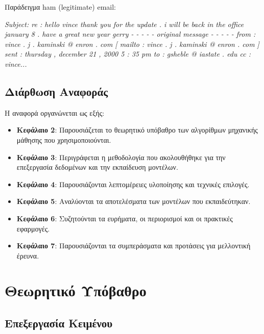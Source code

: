 \documentclass[12pt,a4paper,twoside]{book}
\begin{document}
Παράδειγμα ham (legitimate) email:

\begin{tcolorbox}[colback=customBgGray!30, colframe=customCodeGreen, title=Παράδειγμα Ham Email]
    \small
    \textit{Subject: re : hello vince thank you for the update . i will be back in the office january 8 . have a great new year gerry - - - - - original message - - - - - from : vince . j . kaminski @ enron . com [ mailto : vince . j . kaminski @ enron . com ] sent : thursday , december 21 , 2000 5 : 35 pm to : gsheble @ iastate . edu cc : vince...}
\end{tcolorbox}

\section{Διάρθωση Αναφοράς}

Η αναφορά οργανώνεται ως εξής:

\begin{itemize}
    \item \textbf{Κεφάλαιο 2}: Παρουσιάζεται το θεωρητικό υπόβαθρο των αλγορίθμων μηχανικής μάθησης που χρησιμοποιούνται.
    \item \textbf{Κεφάλαιο 3}: Περιγράφεται η μεθοδολογία που ακολουθήθηκε για την επεξεργασία δεδομένων και την εκπαίδευση μοντέλων.
    \item \textbf{Κεφάλαιο 4}: Παρουσιάζονται λεπτομέρειες υλοποίησης και τεχνικές επιλογές.
    \item \textbf{Κεφάλαιο 5}: Αναλύονται τα αποτελέσματα των μοντέλων που εκπαιδεύτηκαν.
    \item \textbf{Κεφάλαιο 6}: Συζητούνται τα ευρήματα, οι περιορισμοί και οι πρακτικές εφαρμογές.
    \item \textbf{Κεφάλαιο 7}: Παρουσιάζονται τα συμπεράσματα και προτάσεις για μελλοντική έρευνα.
\end{itemize}

\chapter{Θεωρητικό Υπόβαθρο}

\section{Επεξεργασία Κειμένου}
\end{document}
